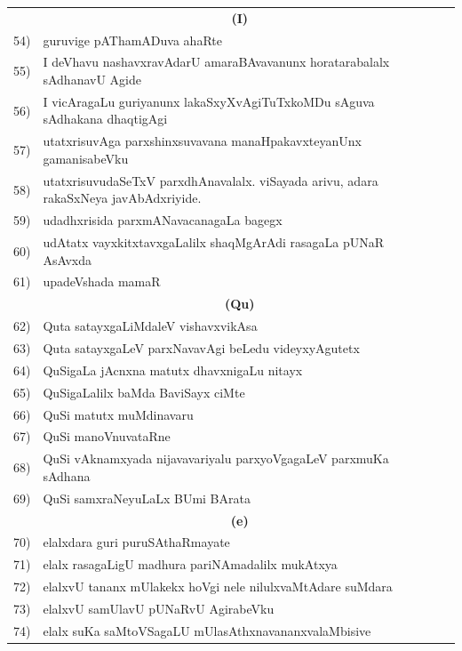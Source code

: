 \begin{longtable}{@{}cp{7.4cm}r}
    & \multicolumn{1}{c}{\textbf{(I)}} & \\[0.3cm]
54) & guruvige pAThamADuva ahaRte &  \pageref{page105b}\\
55) & I deVhavu nashavxravAdarU amaraBAvavanunx horatarabalalx sAdhanavU Agide &\pageref{page129}\\
56) & I vicAragaLu guriyanunx lakaSxyXvAgiTuTxkoMDu sAguva sAdhakana dhaqtigAgi & \pageref{page218}\\
57) & utatxrisuvAga parxshinxsuvavana manaHpakavxteyanUnx gamanisabeVku & \pageref{page219}\\
58) & utatxrisuvudaSeTxV parxdhAnavalalx. viSayada arivu, adara rakaSxNeya javAbAdxriyide.& \pageref{page176a}\\
59) & udadhxrisida parxmANavacanagaLa bagegx   & \pageref{page158}\\
60) & udAtatx vayxkitxtavxgaLalilx shaqMgArAdi rasagaLa pUNaR AsAvxda  & \pageref{page229a}\\
61) & upadeVshada mamaR  & \pageref{page83}\\[0.5cm]
    &  \multicolumn{1}{c}{\textbf{(Qu)}} & \\[0.5cm] 
62) & Quta satayxgaLiMdaleV vishavxvikAsa  & \pageref{page87a}\\   
63) & Quta satayxgaLeV parxNavavAgi beLedu videyxyAgutetx & \pageref{page87b}\\
64) & QuSigaLa jAcnxna matutx dhavxnigaLu nitayx & \pageref{page122b}\\
65) & QuSigaLalilx baMda BaviSayx ciMte & \pageref{page106}\\
66) & QuSi matutx muMdinavaru & \pageref{page123}\\
67)  & QuSi manoVnuvataRne & \pageref{page114}\\
68) & QuSi vAknamxyada nijavavariyalu parxyoVgagaLeV parxmuKa sAdhana & \pageref{page143}\\
69)  & QuSi samxraNeyuLaLx BUmi BArata & \pageref{page104}\\[0.3cm]
     &  \multicolumn{1}{c}{\textbf{(e)}} & \\[0.3cm]
70) & elalxdara guri puruSAthaRmayate & \pageref{page96}\\
71) & elalx rasagaLigU madhura pariNAmadalilx mukAtxya & \pageref{page231a}\\
72)  & elalxvU tananx mUlakekx hoVgi nele nilulxvaMtAdare suMdara & \pageref{page246}\\
73) & elalxvU samUlavU pUNaRvU AgirabeVku & \pageref{page190b}\\
74)  & elalx suKa saMtoVSagaLU mUlasAthxnavananxvalaMbisive & \pageref{page194a}\\

\end{longtable}
